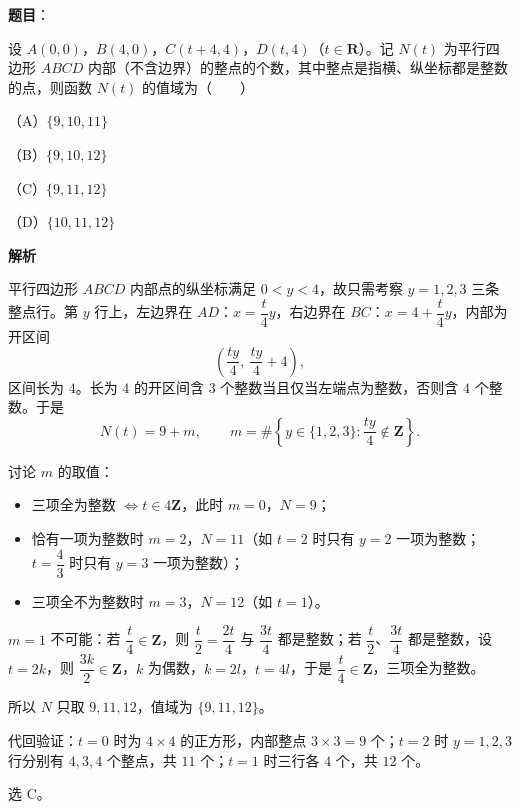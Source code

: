\begin{answer}

\textbf{题目}：

设 $A(0,0)$，$B(4,0)$，$C(t+4,4)$，$D(t,4)$（$t\in\mathbf R$）。记 $N(t)$ 为平行四边形 $ABCD$ 内部（不含边界）的整点的个数，其中整点是指横、纵坐标都是整数的点，则函数 $N(t)$ 的值域为\mbox{（　　）}

（A）$\{9,10,11\}$

（B）$\{9,10,12\}$

（C）$\{9,11,12\}$

（D）$\{10,11,12\}$

\textbf{解析}

平行四边形 $ABCD$ 内部点的纵坐标满足 $0<y<4$，故只需考察 $y=1,2,3$ 三条整点行。第 $y$ 行上，左边界在 $AD$：$x=\dfrac t4y$，右边界在 $BC$：$x=4+\dfrac t4y$，内部为开区间
\nopagebreak[4]
\[
\left(\frac{ty}{4},\ \frac{ty}{4}+4\right),
\]
区间长为 $4$。长为 $4$ 的开区间含 $3$ 个整数当且仅当左端点为整数，否则含 $4$ 个整数。于是
\nopagebreak[4]
\[
N(t)=9+m,\qquad m=\#\left\{y\in\{1,2,3\}:\frac{ty}{4}\notin\mathbf Z\right\}.
\]

讨论 $m$ 的取值：

\begin{itemize}
\item 三项全为整数 $\iff t\in4\mathbf Z$，此时 $m=0$，$N=9$；
\item 恰有一项为整数时 $m=2$，$N=11$（如 $t=2$ 时只有 $y=2$ 一项为整数；$t=\dfrac43$ 时只有 $y=3$ 一项为整数）；
\item 三项全不为整数时 $m=3$，$N=12$（如 $t=1$）。
\end{itemize}

$m=1$ 不可能：若 $\dfrac t4\in\mathbf Z$，则 $\dfrac t2=\dfrac{2t}4$ 与 $\dfrac{3t}4$ 都是整数；若 $\dfrac t2$、$\dfrac{3t}4$ 都是整数，设 $t=2k$，则 $\dfrac{3k}2\in\mathbf Z$，$k$ 为偶数，$k=2l$，$t=4l$，于是 $\dfrac t4\in\mathbf Z$，三项全为整数。

所以 $N$ 只取 $9,11,12$，值域为 $\{9,11,12\}$。

代回验证：$t=0$ 时为 $4\times4$ 的正方形，内部整点 $3\times3=9$ 个；$t=2$ 时 $y=1,2,3$ 行分别有 $4,3,4$ 个整点，共 $11$ 个；$t=1$ 时三行各 $4$ 个，共 $12$ 个。

选 C。


\end{answer}
